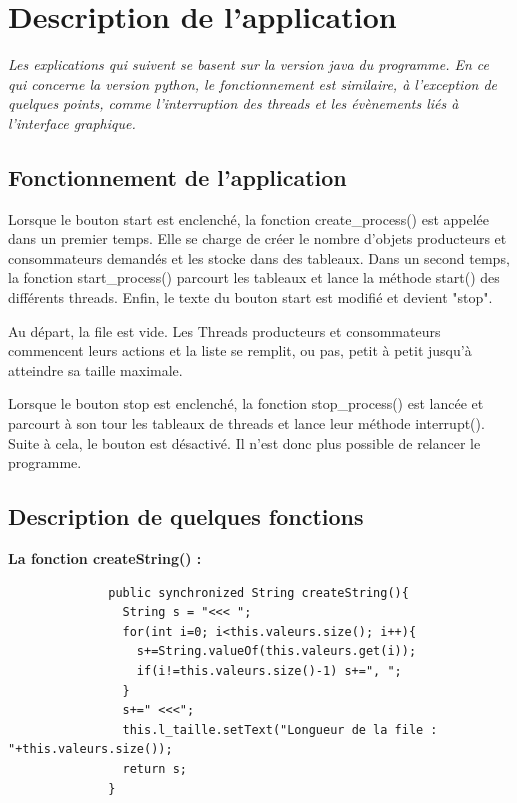 \documentclass{article}
\begin{document}
\section{Description de l'application}
\label{section:fonctionnement}
    \textit{Les explications qui suivent se basent sur la version java du programme. En ce qui concerne la version python, le fonctionnement est similaire, à l'exception de quelques points, comme l'interruption des threads et les évènements liés à l'interface graphique.}

\subsection{Fonctionnement de l'application}

Lorsque le bouton start est enclenché, la fonction create\_process() est appelée dans un premier temps. Elle se charge de créer le nombre d'objets producteurs et consommateurs demandés et les stocke dans des tableaux.
Dans un second temps, la fonction start\_process() parcourt les tableaux et lance la méthode start() des différents threads.
Enfin, le texte du bouton start est modifié et devient "stop".

Au départ, la file est vide. Les Threads producteurs et consommateurs commencent leurs actions et la liste se remplit, ou pas, petit à petit jusqu'à atteindre sa taille maximale.

Lorsque le bouton stop est enclenché, la fonction stop\_process() est lancée et parcourt à son tour les tableaux de threads et lance leur méthode interrupt().
Suite à cela, le bouton est désactivé. Il n'est donc plus possible de relancer le programme.

\cleardoublepage

\subsection{Description de quelques fonctions}
    \textbf{La fonction createString() : }
        \begin{verbatim}
              public synchronized String createString(){
                String s = "<<< ";
                for(int i=0; i<this.valeurs.size(); i++){
                  s+=String.valueOf(this.valeurs.get(i));
                  if(i!=this.valeurs.size()-1) s+=", ";
                }
                s+=" <<<";
                this.l_taille.setText("Longueur de la file : "+this.valeurs.size());
                return s;
              }
        \end{verbatim}
\end{document}
